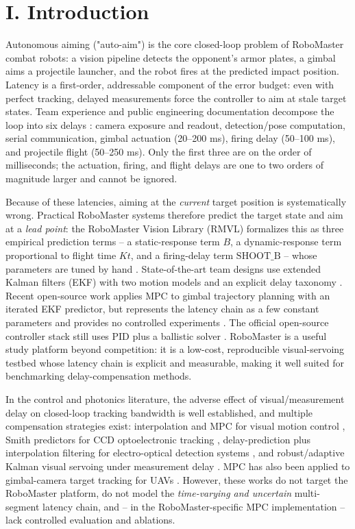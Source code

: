 \documentclass[journal]{IEEEtran}
\begin{document}
\section*{I. Introduction}

Autonomous aiming ("auto-aim") is the core closed-loop problem of RoboMaster combat robots: a vision pipeline detects the opponent's armor plates, a gimbal aims a projectile launcher, and the robot fires at the predicted impact position. Latency is a first-order, addressable component of the error budget: even with perfect tracking, delayed measurements force the controller to aim at stale target states. Team experience and public engineering documentation decompose the loop into six delays \cite{ref1}\cite{ref2}: camera exposure and readout, detection/pose computation, serial communication, gimbal actuation (20--200 ms), firing delay (50--100 ms), and projectile flight (50--250 ms). Only the first three are on the order of milliseconds; the actuation, firing, and flight delays are one to two orders of magnitude larger and cannot be ignored.

Because of these latencies, aiming at the \textit{current} target position is systematically wrong. Practical RoboMaster systems therefore predict the target state and aim at a \textit{lead point}: the RoboMaster Vision Library (RMVL) formalizes this as three empirical prediction terms -- a static-response term $B$, a dynamic-response term proportional to flight time $Kt$, and a firing-delay term $\mathrm{SHOOT\_B}$ -- whose parameters are tuned by hand \cite{ref1}. State-of-the-art team designs use extended Kalman filters (EKF) with two motion models and an explicit delay taxonomy \cite{ref2}. Recent open-source work applies MPC to gimbal trajectory planning with an iterated EKF predictor, but represents the latency chain as a few constant parameters and provides no controlled experiments \cite{ref3}. The official open-source controller stack still uses PID plus a ballistic solver \cite{ref4}. RoboMaster is a useful study platform beyond competition: it is a low-cost, reproducible visual-servoing testbed whose latency chain is explicit and measurable, making it well suited for benchmarking delay-compensation methods.

In the control and photonics literature, the adverse effect of visual/measurement delay on closed-loop tracking bandwidth is well established, and multiple compensation strategies exist: interpolation and MPC for visual motion control \cite{ref5}, Smith predictors for CCD optoelectronic tracking \cite{ref6}, delay-prediction plus interpolation filtering for electro-optical detection systems \cite{ref7}\cite{ref8}, and robust/adaptive Kalman visual servoing under measurement delay \cite{ref9}\cite{ref10}. MPC has also been applied to gimbal-camera target tracking for UAVs \cite{ref11}. However, these works do not target the RoboMaster platform, do not model the \textit{time-varying and uncertain} multi-segment latency chain, and -- in the RoboMaster-specific MPC implementation \cite{ref3} -- lack controlled evaluation and ablations.
\end{document}
